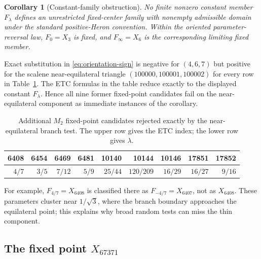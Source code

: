 \documentclass[11pt]{article}
\newtheorem{corollary}[theorem]{Corollary}
\begin{document}
\begin{corollary}[Constant-family obstruction]
No finite nonzero constant member $F_\lambda$ defines an unrestricted
fixed-center family with nonempty admissible domain under the standard
positive-Heron convention.  Within the
oriented parameter-reversal law, $F_0=X_3$ is fixed, and
$F_\infty=X_6$ is the corresponding limiting fixed member.
\end{corollary}

Exact substitution in \eqref{eq:orientation-sign} is negative for $(4,6,7)$
but positive for the scalene near-equilateral triangle
$(100000,100001,100002)$ for every row in Table~\ref{tab:near-equilateral}.
The ETC formulas in the table reduce exactly to the displayed constant
$F_\lambda$.  Hence all nine former fixed-point candidates fail on the
near-equilateral component as immediate instances of the corollary.

\begin{table}[H]
\centering
\caption{Additional $M_2$ fixed-point candidates rejected exactly by the
near-equilateral branch test. The upper row gives the ETC index; the lower row gives $\lambda$.}
\label{tab:near-equilateral}
\small
\begin{tabular}{@{}rrrrrrrrr@{}}
\toprule
6408&6454&6469&6481&10140&10144&10146&17851&17852\\
\midrule
$4/7$&$3/5$&$7/12$&$5/9$&$25/44$&$120/209$&$16/29$&$16/27$&$9/16$\\
\bottomrule
\end{tabular}
\end{table}
For example, $F_{4/7}=X_{6408}$ is classified there as
$F_{-4/7}=X_{6407}$, not as $X_{6408}$.  These parameters cluster near
$1/\sqrt3$, where the branch boundary approaches the equilateral point;
this explains why broad random tests can miss the thin component.

\subsection{\texorpdfstring{The fixed point $X_{67371}$}
{The fixed point X67371}}
\end{document}
